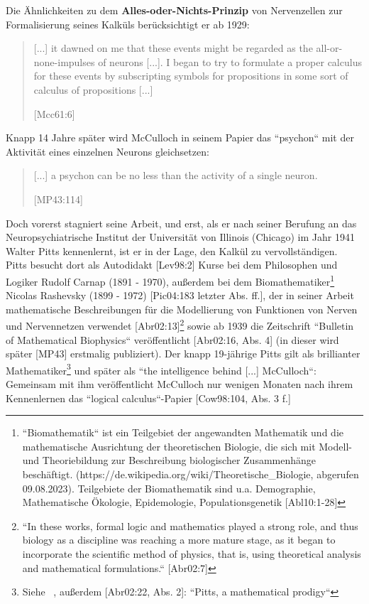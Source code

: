 Die Ähnlichkeiten zu dem \textbf{Alles-oder-Nichts-Prinzip} von Nervenzellen zur Formalisierung seines Kalküls berücksichtigt er ab 1929:

\blockquote[{[Mcc61:6]}]{
    [...] it dawned on me that these events might be regarded as the all-or-none-impulses of neurons [...]. I began to try to formulate a proper calculus for these events by subscripting symbols for propositions in some sort of calculus of propositions [...]
}

Knapp 14 Jahre später wird McCulloch in seinem Papier das ``psychon`` mit der Aktivität eines einzelnen Neurons gleichsetzen:

\blockquote[{[MP43:114]}]{
    [...] a psychon can be no less than the activity of a single neuron.
}

Doch vorerst stagniert seine Arbeit, und erst, als er nach seiner Berufung an das Neuropsychiatrische Institut der Universität von Illinois (Chicago) im Jahr 1941 Walter Pitts kennenlernt, ist er in der Lage, den Kalkül zu vervollständigen.\\

Pitts besucht dort als Autodidakt [Lev98:2] Kurse bei dem Philosophen und Logiker Rudolf Carnap (1891 - 1970), außerdem bei dem Biomathematiker\footnote{
    ``Biomathematik`` ist ein Teilgebiet der angewandten Mathematik und die mathematische Ausrichtung der theoretischen Biologie, die sich mit Modell- und Theoriebildung zur Beschreibung biologischer Zusammenhänge beschäftigt. ({https://de.wikipedia.org/wiki/Theoretische\_Biologie}, abgerufen 09.08.2023). Teilgebiete der Biomathematik sind u.a. Demographie, Mathematische Ökologie, Epidemologie, Populationsgenetik [Abl10:1-28]
} Nicolas Rashevsky (1899 - 1972) [Pic04:183 letzter Abs. ff.], der in seiner Arbeit mathematische Beschreibungen für die Modellierung von Funktionen von Nerven und Nervennetzen verwendet [Abr02:13]\footnote{
    ``In these works, formal logic and mathematics played a strong role, and thus biology as a discipline was reaching a more mature stage, as it began to incorporate the scientific method of physics, that is, using theoretical analysis and mathematical formulations.`` [Abr02:7]
} sowie ab 1939 die Zeitschrift ``Bulletin of Mathematical Biophysics`` veröffentlicht [Abr02:16, Abs. 4] (in dieser wird später [MP43] erstmalig publiziert).
Der knapp 19-jährige Pitts gilt als brillianter Mathematiker\footnote{
    Siehe ~\cite[4]{Arb19}, außerdem [Abr02:22, Abs. 2]: ``Pitts, a mathematical prodigy``
} und später als ``the intelligence behind [...] McCulloch``: Gemeinsam mit ihm veröffentlicht McCulloch nur wenigen Monaten nach ihrem Kennenlernen das ``logical calculus``-Papier [Cow98:104, Abs. 3 f.]


